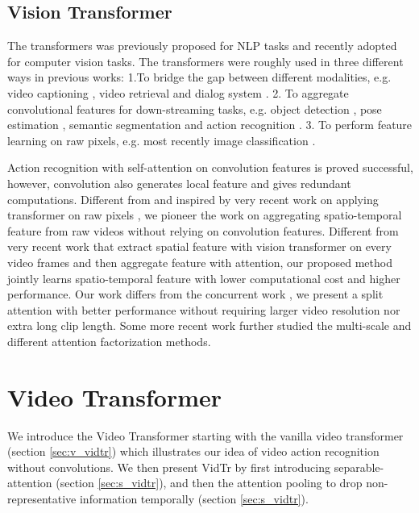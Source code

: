 \documentclass[10pt,twocolumn,letterpaper]{article}
\begin{document}
\subsection{Vision Transformer}
The transformers \cite{vaswani2017attention} was previously proposed for NLP tasks \cite{devlin2019bert} and recently adopted for computer vision tasks. The transformers were roughly used in three different ways in previous works:
1.To bridge the gap between different modalities, e.g. video captioning \cite{zhou2018end}, video retrieval \cite{gabeur2020multi} and dialog system \cite{li2020bridging}.
2. To aggregate convolutional features for down-streaming tasks, e.g. object detection \cite{dai2020up,carion2020end}, pose estimation \cite{yang2020transpose}, semantic segmentation \cite{duke2021sstvos} and action recognition \cite{girdhar2019video}.
3. To perform feature learning on raw pixels, e.g. most recently image classification \cite{dosovitskiy2020image, touvron2020training}.

Action recognition with self-attention on convolution features \cite{girdhar2019video} is proved successful, however, convolution also generates local feature and gives redundant computations. Different from \cite{girdhar2019video} and inspired by very recent work on applying transformer on raw pixels \cite{dosovitskiy2020image, touvron2020training}, we pioneer the work on aggregating spatio-temporal feature from raw videos without relying on convolution features. 
Different from very recent work \cite{neimark2021video} that extract spatial feature with vision transformer on every video frames and then aggregate feature with attention, our proposed method jointly learns spatio-temporal feature with lower computational cost and higher performance. 
Our work differs from the concurrent work \cite{bertasius2021space}, we present a split attention with better performance without requiring larger video resolution nor extra long clip length. 
Some more recent work \cite{bertasius2021space,fan2021multiscale,bertasius2021space,patrick2021keeping,arnab2021vivit,liu2021video} further studied the multi-scale and different attention factorization methods.  
\section{Video Transformer}
We introduce the Video Transformer starting with the vanilla video transformer (section \ref{sec:v_vidtr}) which illustrates our idea of video action recognition without convolutions. We then present VidTr by first introducing separable-attention (section \ref{sec:s_vidtr}), and then the attention pooling to drop non-representative information temporally (section \ref{sec:s_vidtr}). 
\end{document}
